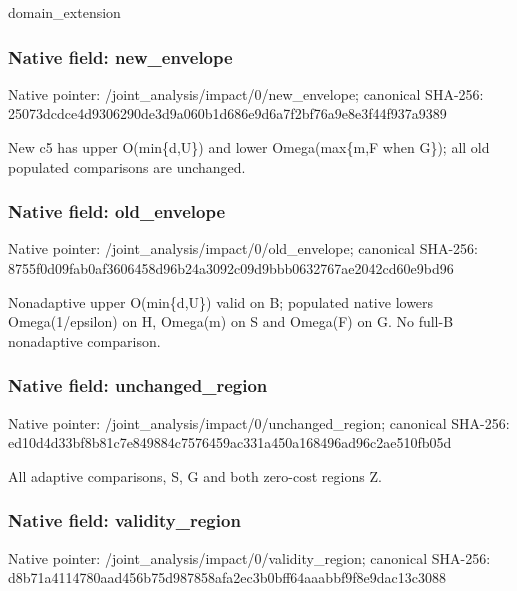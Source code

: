 \documentclass[10pt,a4paper]{article}
\begin{document}
\begingroup\raggedright\sloppy domain\_\allowbreak{}extension\par\endgroup

\subsubsection{Native field: new\_\allowbreak{}envelope}
Native pointer: /joint\_\allowbreak{}analysis/impact/0/new\_\allowbreak{}envelope; canonical SHA-256: 25073dcdce4d9306290de3d9a060b1d686e9d6a7f2bf76a9e8e3f44f937a9389

\begingroup\raggedright\sloppy New c5 has upper O(min\{d,\allowbreak{}U\}) and lower Omega(max\{m,\allowbreak{}F when G\});\allowbreak{} all old populated comparisons are unchanged.\par\endgroup

\subsubsection{Native field: old\_\allowbreak{}envelope}
Native pointer: /joint\_\allowbreak{}analysis/impact/0/old\_\allowbreak{}envelope; canonical SHA-256: 8755f0d09fab0af3606458d96b24a3092c09d9bbb0632767ae2042cd60e9bd96

\begingroup\raggedright\sloppy Nonadaptive upper O(min\{d,\allowbreak{}U\}) valid on B;\allowbreak{} populated native lowers Omega(1/\allowbreak{}epsilon) on H,\allowbreak{} Omega(m) on S and Omega(F) on G. No full-B nonadaptive comparison.\par\endgroup

\subsubsection{Native field: unchanged\_\allowbreak{}region}
Native pointer: /joint\_\allowbreak{}analysis/impact/0/unchanged\_\allowbreak{}region; canonical SHA-256: ed10d4d33bf8b81c7e849884c7576459ac331a450a168496ad96c2ae510fb05d

\begingroup\raggedright\sloppy All adaptive comparisons,\allowbreak{} S,\allowbreak{} G and both zero-cost regions Z.\par\endgroup

\subsubsection{Native field: validity\_\allowbreak{}region}
Native pointer: /joint\_\allowbreak{}analysis/impact/0/validity\_\allowbreak{}region; canonical SHA-256: d8b71a4114780aad456b75d987858afa2ec3b0bff64aaabbf9f8e9dac13c3088
\end{document}
